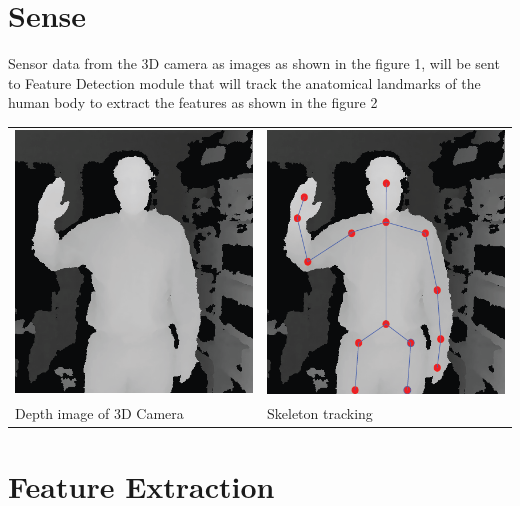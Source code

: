 \section{Sense} Sensor data from the 3D camera as images as shown in the figure 1, will be sent to Feature Detection module that will track the anatomical landmarks of the human body to extract the features as shown in the figure 2
\begin{table}
	[h] \centering 
	\begin{tabular}
		{ll} 
		\includegraphics[height=7cm]{figures/depth.png} & 
		\includegraphics[height=7cm]{figures/depth-skeleton.png} \\
		Depth image of 3D Camera & Skeleton tracking 
	\end{tabular}
\end{table}

\section{Feature Extraction}


